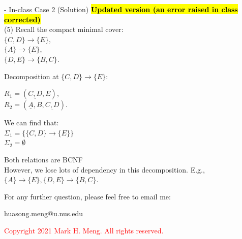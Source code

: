\begin{frame}[fragile]{ - In-class Case 2 (Solution)}
	\textcolor{red}{\textbf{\hl{Updated version (an error raised in class corrected)}}}\\
	(5) Recall the compact minimal cover:\\
	
	$\{C,D\} \rightarrow \{E\},$\\
	$\{A\}  \rightarrow \{E\},$\\
	$\{D,E\} \rightarrow \{B,C\}.$\\\vspace{5pt}
	
	Decomposition at $\{C,D\} \rightarrow \{E\}$:\\\vspace{5pt}
		
	$R_1 = (\underline{C,D}, E),$\\
	$R_2 = (\underline{A}, B, \underline{C,D}).$\\\vspace{5pt}
	
	We can find that:\\\vspace{5pt}
	$\Sigma_1 = \{\{C,D\}\rightarrow\{E\}\}$\\
	$\Sigma_2 = \emptyset$
	
	Both relations are BCNF\\\vspace{5pt}
	However, we lose lots of dependency in this decomposition. E.g., $\{A\}\rightarrow\{E\}, \{D,E\}\rightarrow\{B,C\}$.
\end{frame}

\begin{frame}{}
	\centering  
	For any further question, please feel free to email me:\vspace{10pt}
	
	huasong.meng@u.nus.edu\\\vspace{3pt}
	
	\begin{tcolorbox}
		\begin{center}
			\textcolor{red}{Copyright 2021 Mark H. Meng. All rights reserved.}
		\end{center}
	\end{tcolorbox}
\end{frame}
